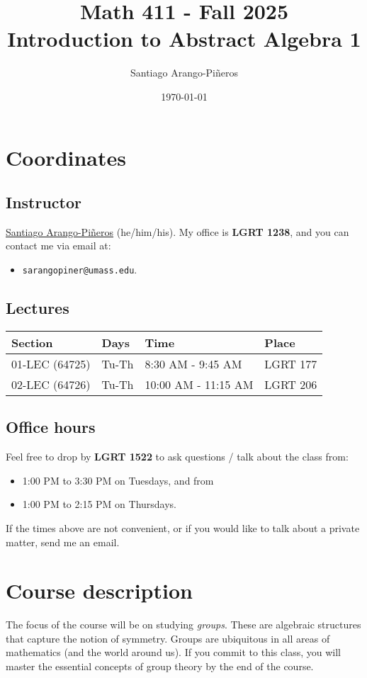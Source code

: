 \documentclass[11pt]{article}
\author{Santiago Arango-Piñeros}
\date{\today}
\title{Math 411 - Fall 2025\\\medskip
\large Introduction to Abstract Algebra 1}
\begin{document}
\maketitle
\tableofcontents


\section*{Coordinates}
\label{sec:org731aa63}
\subsection*{Instructor}
\label{sec:org50f7bd2}
\href{https://sarangop1728.github.io/}{Santiago Arango-Piñeros} (he/him/his).
My office is \textbf{LGRT 1238}, and you can contact me via email at:
\begin{itemize}
\item \texttt{sarangopiner@umass.edu}.
\end{itemize}

\subsection*{Lectures}
\label{sec:orge5a559b}
\begin{center}
\begin{tabular}{l|l|l|l}
\hline
Section & Days & Time & Place\\[0pt]
\hline
01-LEC (64725) & Tu-Th & 8:30 AM - 9:45 AM & LGRT 177\\[0pt]
02-LEC (64726) & Tu-Th & 10:00 AM - 11:15 AM & LGRT 206\\[0pt]
\hline
\end{tabular}
\end{center}

\subsection*{Office hours}
\label{sec:org5b54e79}
Feel free to drop by \textbf{LGRT 1522} to ask questions / talk about the class
from:
\begin{itemize}
\item 1:00 PM to 3:30 PM on Tuesdays, and from
\item 1:00 PM to 2:15 PM on Thursdays.
\end{itemize}
If the times above are not convenient, or if you would like to talk about a
private matter, send me an email.

\section*{Course description}
\label{sec:orgc774b0d}
The focus of the course will be on studying \emph{groups}. These are algebraic
structures that capture the notion of symmetry. Groups are ubiquitous in all
areas of mathematics (and the world around us). If you commit to this class,
you will master the essential concepts of group theory by the end of the
course.
\end{document}
